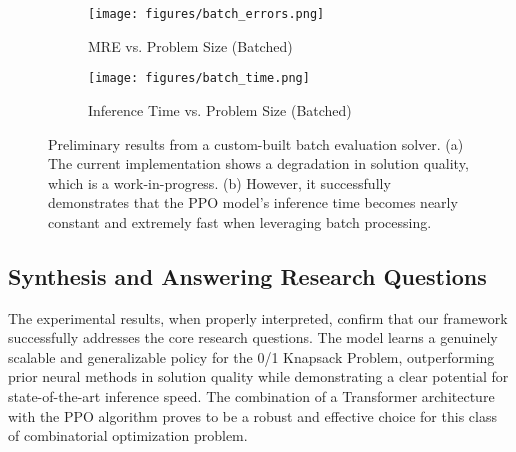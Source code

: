 
\begin{figure}[htbp]
    \centering
    \begin{subfigure}[b]{0.48\textwidth}
        \centering
        \texttt{[image: figures/batch\_errors.png]}
        \caption{MRE vs. Problem Size (Batched)}
        \label{fig:batch_mre}
    \end{subfigure}
    \hfill %
    \begin{subfigure}[b]{0.48\textwidth}
        \centering
        \texttt{[image: figures/batch\_time.png]}
        \caption{Inference Time vs. Problem Size (Batched)}
        \label{fig:batch_time}
    \end{subfigure}
    
    \caption{Preliminary results from a custom-built batch evaluation solver. (a) The current implementation shows a degradation in solution quality, which is a work-in-progress. (b) However, it successfully demonstrates that the PPO model's inference time becomes nearly constant and extremely fast when leveraging batch processing.}
    \label{fig:batch_solver_results}
\end{figure}

\subsection{Synthesis and Answering Research Questions}
The experimental results, when properly interpreted, confirm that our framework successfully addresses the core research questions. The model learns a genuinely scalable and generalizable policy for the 0/1 Knapsack Problem, outperforming prior neural methods in solution quality while demonstrating a clear potential for state-of-the-art inference speed. The combination of a Transformer architecture with the PPO algorithm proves to be a robust and effective choice for this class of combinatorial optimization problem.